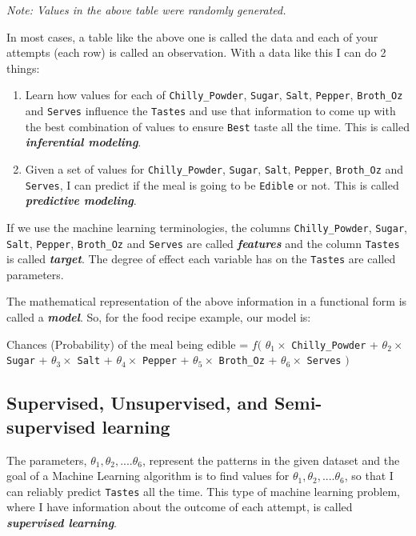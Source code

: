 \documentclass[
  letterpaper,
]{book}
\providecommand{\tightlist}{%
  \setlength{\itemsep}{0pt}\setlength{\parskip}{0pt}}\usepackage{longtable,booktabs,array}
\begin{document}
\emph{Note: Values in the above table were randomly generated.}

In most cases, a table like the above one is called the data and each of
your attempts (each row) is called an observation. With a data like this
I can do 2 things:

\begin{enumerate}
\def\labelenumi{\arabic{enumi}.}
\tightlist
\item
  Learn how values for each of \texttt{Chilly\_Powder}, \texttt{Sugar},
  \texttt{Salt}, \texttt{Pepper}, \texttt{Broth\_Oz} and \texttt{Serves}
  influence the \texttt{Tastes} and use that information to come up with
  the best combination of values to ensure \texttt{Best} taste all the
  time. This is called \textbf{\emph{inferential modeling}}.
\item
  Given a set of values for \texttt{Chilly\_Powder}, \texttt{Sugar},
  \texttt{Salt}, \texttt{Pepper}, \texttt{Broth\_Oz} and
  \texttt{Serves}, I can predict if the meal is going to be
  \texttt{Edible} or not. This is called \textbf{\emph{predictive
  modeling}}.
\end{enumerate}

If we use the machine learning terminologies, the columns
\texttt{Chilly\_Powder}, \texttt{Sugar}, \texttt{Salt}, \texttt{Pepper},
\texttt{Broth\_Oz} and \texttt{Serves} are called
\textbf{\emph{features}} and the column \texttt{Tastes} is called
\textbf{\emph{target}}. The degree of effect each variable has on the
\texttt{Tastes} are called parameters.

The mathematical representation of the above information in a functional
form is called a \textbf{\emph{model}}. So, for the food recipe example,
our model is:

Chances (Probability) of the meal being edible = \(f(\)
\(\theta_1 \times\) \texttt{Chilly\_Powder} + \(\theta_2 \times\)
\texttt{Sugar} + \(\theta_3 \times\) \texttt{Salt} + \(\theta_4 \times\)
\texttt{Pepper} + \(\theta_5 \times\) \texttt{Broth\_Oz} +
\(\theta_6 \times\) \texttt{Serves} \()\)

\hypertarget{supervised-unsupervised-and-semi-supervised-learning}{%
\subsection{Supervised, Unsupervised, and Semi-supervised
learning}\label{supervised-unsupervised-and-semi-supervised-learning}}

The parameters, \(\theta_1, \theta_2, ....\theta_6\), represent the
patterns in the given dataset and the goal of a Machine Learning
algorithm is to find values for \(\theta_1, \theta_2, ....\theta_6\), so
that I can reliably predict \texttt{Tastes} all the time. This type of
machine learning problem, where I have information about the outcome of
each attempt, is called \textbf{\emph{supervised learning}}.
\end{document}
